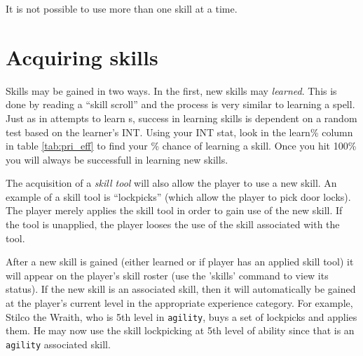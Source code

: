 It is not possible to use more than one skill at a time.

\section{Acquiring skills}

Skills may be gained in two ways. In the first, new skills may {\em learned}.
This is done by reading a ``skill scroll'' and the process is very similar
to learning a spell. Just as in attempts to learn \incantation s, success in
learning skills is dependent on a random test based on the learner's INT.
Using your INT stat, look in the learn\% column in table \ref{tab:pri_eff}
to find your \% chance of learning a skill. Once you hit 100\% you will
always be successfull in learning new skills.

The acquisition of a {\em skill tool} will also allow the player to use
a new skill. An example of a skill tool is ``lockpicks''
(which allow the
player to pick door locks). The player merely applies the skill
tool in order to gain use of the new skill. If the tool is unapplied,
the player looses the use of the skill associated with the tool.

After a new skill is gained (either learned or if player has an applied
skill tool) it will appear on the player's skill roster (use the
'skills' command to view its status). If the new skill is an associated
skill, then it will automatically be gained at the player's current level
in the appropriate experience category. For example, Stilco the Wraith,
who is 5th level in {\tt agility}, buys a set of lockpicks and applies them.
He may now use the skill lockpicking at 5th level of ability since that
is an {\tt agility} associated skill.
